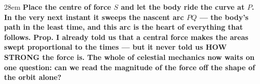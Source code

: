 \documentclass[border=4pt]{standalone}
\begin{document}
\begin{varwidth}{28em}
\large\bfseries
Place the \textcolor{centerorange}{centre of force $S$} and let the body ride the curve at $P$. In the very next      instant it sweeps the \textcolor{arcblue}{nascent arc $PQ$ — the body's path in the least time}, and this arc is the      heart of everything that follows. Prop. I already told us that a central force makes the areas swept      proportional to the times — but it never told us HOW STRONG the force is. The whole of celestial      mechanics now waits on one question: can we read the magnitude of the force off the shape of the orbit alone?
\end{varwidth}
\end{document}
